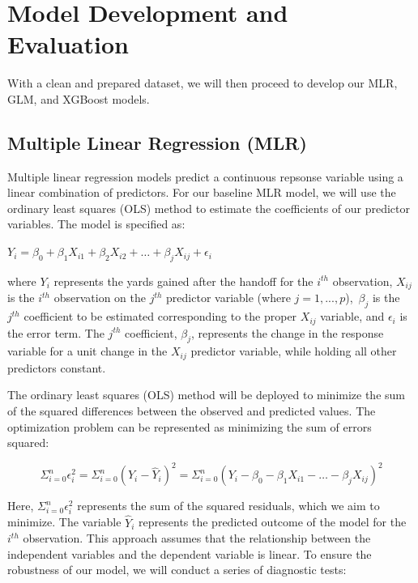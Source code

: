 \documentclass[
  super,
  preprint,
  3p]{elsarticle}
\begin{document}
\hypertarget{model-development-and-evaluation}{%
\section{Model Development and
Evaluation}\label{model-development-and-evaluation}}

With a clean and prepared dataset, we will then proceed to develop our
MLR, GLM, and XGBoost models.

\hypertarget{multiple-linear-regression-mlr}{%
\subsection{Multiple Linear Regression
(MLR)}\label{multiple-linear-regression-mlr}}

Multiple linear regression models predict a continuous repsonse variable
using a linear combination of predictors. For our baseline MLR model, we
will use the ordinary least squares (OLS) method to estimate the
coefficients of our predictor variables. The model is specified as:

\(Y_i = \beta_0 + \beta_1X_{i1} + \beta_2X_{i2} + \ldots + \beta_jX_{ij} + \epsilon_i\)

where \(Y_i\) represents the yards gained after the handoff for the
\(i^{th}\) observation, \(X_{ij}\) is the \(i^{th}\) observation on the
\(j^{th}\) predictor variable (where \(j = 1, ..., p\)),~\(\beta_j\) is
the \(j^{th}\) coefficient to be estimated corresponding to the proper
\(X_{ij}\) variable, and \(\epsilon_i\) is the error term. The
\(j^{th}\) coefficient, \(\beta_j\), represents the change in the
response variable for a unit change in the \(X_{ij}\) predictor
variable, while holding all other predictors constant.

The ordinary least squares (OLS) method will be deployed to minimize the
sum of the squared differences between the observed and predicted
values. The optimization problem can be represented as minimizing the
sum of errors squared:

\[
\Sigma_{i=0}^n \epsilon_i^2 = \Sigma_{i=0}^n (Y_i - \hat{Y}_i)^2 = \Sigma_{i=0}^n (Y_i - \beta_0 - \beta_1X_{i1} - \ldots - \beta_jX_{ij})^2
\]

Here, \(\Sigma_{i=0}^n \epsilon_i^2\) represents the sum of the squared
residuals, which we aim to minimize. The variable \(\hat{Y}_i\)
represents the predicted outcome of the model for the \(i^{th}\)
observation. This approach assumes that the relationship between the
independent variables and the dependent variable is linear. To ensure
the robustness of our model, we will conduct a series of diagnostic
tests:
\end{document}
